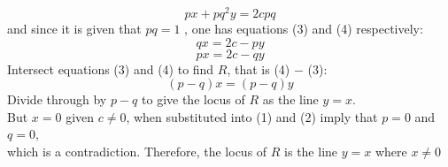 \documentclass[11pt,a4paper]{article}
\begin{document}
\begin{equation*}
px+pq^2y=2cpq
\end{equation*}
and since it is given that $pq=1$ , one has equations (3) and (4) respectively:
\begin{equation}
qx=2c-py
\end{equation}
\begin{equation}
px=2c-qy
\end{equation}
Intersect equations (3) and (4) to find $R$, that is (4) $-$ (3):
$$(p-q)x =(p-q)y$$
Divide through by $p-q$ to give the locus of $R$ as the line $y=x$.\\[1em]
But $x=0$ given $c\ne 0$, when substituted into (1) and (2) imply that $p=0$ and $q=0$,\\ which is a contradiction.
Therefore, the locus of $R$ is the line $y=x$ where $x \ne 0$
\end{document}
